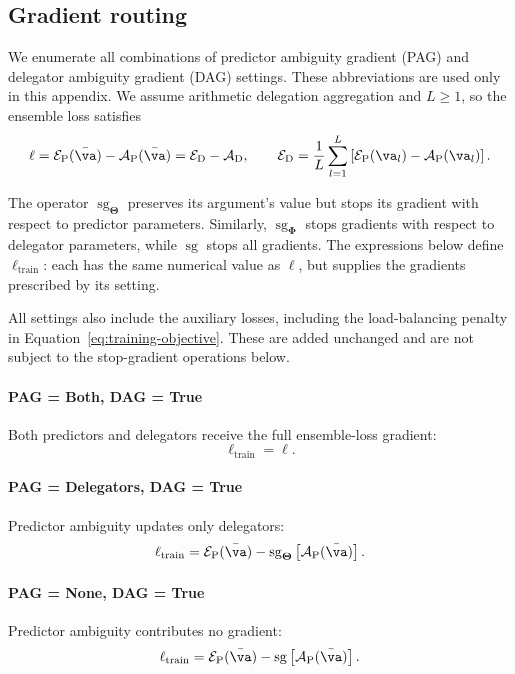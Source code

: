 \documentclass[10pt]{article} %
\def\vTheta{{\bm{\Theta}}}
\def\vPhi{{\bm{\Phi}}}
\newcommand{\dambiguity}{\mathcal{A}_{\mathrm{D}}}
\newcommand{\pambiguity}{\mathcal{A}_{\mathrm{P}}}
\newcommand{\pperformance}{\mathcal{E}_{\mathrm{P}}}
\newcommand{\dperformance}{\mathcal{E}_{\mathrm{D}}}
\newcommand{\sg}{\operatorname{sg}}
\begin{document}
\subsection{Gradient routing}\label{ap:gradient-routing}

We enumerate all combinations of predictor ambiguity gradient (PAG) and delegator ambiguity gradient (DAG) settings. These abbreviations are used only in this appendix. We assume arithmetic delegation aggregation and $L\geq 1$, so the ensemble loss satisfies
\begin{equation}
    \ell
    = \pperformance(\bar{\va})-\pambiguity(\bar{\va})
    = \dperformance-\dambiguity,
    \qquad
    \dperformance
    = \frac{1}{L}\sum_{l=1}^L
      \left[\pperformance(\va_l)-\pambiguity(\va_l)\right].
\end{equation}

The operator $\sg_{\vTheta}$ preserves its argument's value but stops its gradient with respect to predictor parameters. Similarly, $\sg_{\vPhi}$ stops gradients with respect to delegator parameters, while $\sg$ stops all gradients. The expressions below define $\ell_{\mathrm{train}}$: each has the same numerical value as $\ell$, but supplies the gradients prescribed by its setting.

All settings also include the auxiliary losses, including the load-balancing penalty in Equation~\ref{eq:training-objective}. These are added unchanged and are not subject to the stop-gradient operations below.

\paragraph{PAG = Both, DAG = True}
Both predictors and delegators receive the full ensemble-loss gradient:
\begin{equation}
    \ell_{\mathrm{train}} = \ell.
\end{equation}

\paragraph{PAG = Delegators, DAG = True}
Predictor ambiguity updates only delegators:
\begin{equation}
    \ell_{\mathrm{train}}
    = \pperformance(\bar{\va})
      - \sg_{\vTheta}\left[\pambiguity(\bar{\va})\right].
\end{equation}

\paragraph{PAG = None, DAG = True}
Predictor ambiguity contributes no gradient:
\begin{equation}
    \ell_{\mathrm{train}}
    = \pperformance(\bar{\va})
      - \sg\left[\pambiguity(\bar{\va})\right].
\end{equation}
\end{document}
